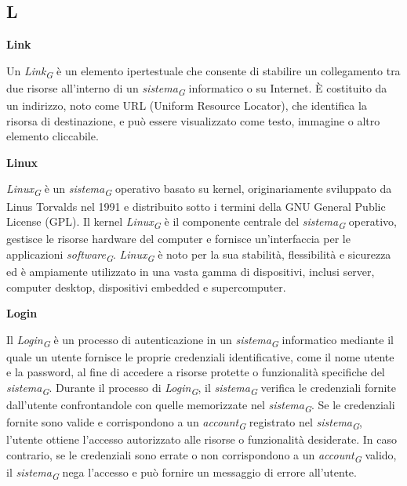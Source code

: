 \subsection{L}

\vspace{0.4cm}

\textbf{Link}

\vspace{0.1cm}

Un \textit{Link}\textsubscript{\textit{G}} è un elemento ipertestuale che consente di stabilire un collegamento tra due risorse all'interno di un \textit{sistema}\textsubscript{\textit{G}} informatico o su Internet. È costituito da un indirizzo, noto come URL (Uniform Resource Locator), che identifica la risorsa di destinazione, e può essere visualizzato come testo, immagine o altro elemento cliccabile.

\vspace{0.4cm}

\textbf{Linux}

\vspace{0.1cm}

\textit{Linux}\textsubscript{\textit{G}} è un \textit{sistema}\textsubscript{\textit{G}} operativo basato su kernel, originariamente sviluppato da Linus Torvalds nel 1991 e distribuito sotto i termini della GNU General Public License (GPL). Il kernel \textit{Linux}\textsubscript{\textit{G}} è il componente centrale del \textit{sistema}\textsubscript{\textit{G}} operativo, gestisce le risorse hardware del computer e fornisce un'interfaccia per le applicazioni \textit{software}\textsubscript{\textit{G}}. \textit{Linux}\textsubscript{\textit{G}} è noto per la sua stabilità, flessibilità e sicurezza ed è ampiamente utilizzato in una vasta gamma di dispositivi, inclusi server, computer desktop, dispositivi embedded e supercomputer. 

\vspace{0.4cm}

\textbf{Login}

\vspace{0.1cm}

Il \textit{Login}\textsubscript{\textit{G}} è un processo di autenticazione in un \textit{sistema}\textsubscript{\textit{G}} informatico mediante il quale un utente fornisce le proprie credenziali identificative, come il nome utente e la password, al fine di accedere a risorse protette o funzionalità specifiche del \textit{sistema}\textsubscript{\textit{G}}. Durante il processo di \textit{Login}\textsubscript{\textit{G}}, il \textit{sistema}\textsubscript{\textit{G}} verifica le credenziali fornite dall'utente confrontandole con quelle memorizzate nel \textit{sistema}\textsubscript{\textit{G}}. Se le credenziali fornite sono valide e corrispondono a un \textit{account}\textsubscript{\textit{G}} registrato nel \textit{sistema}\textsubscript{\textit{G}}, l'utente ottiene l'accesso autorizzato alle risorse o funzionalità desiderate. In caso contrario, se le credenziali sono errate o non corrispondono a un \textit{account}\textsubscript{\textit{G}} valido, il \textit{sistema}\textsubscript{\textit{G}} nega l'accesso e può fornire un messaggio di errore all'utente.

